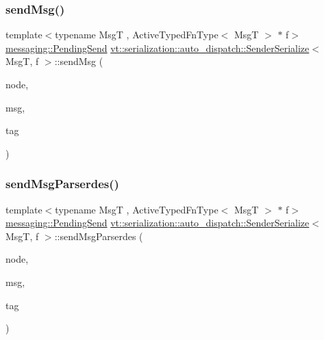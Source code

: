 \subsubsection{\texorpdfstring{send\+Msg()}{sendMsg()}}
{\footnotesize\ttfamily template$<$typename MsgT , Active\+Typed\+Fn\+Type$<$ Msg\+T $>$ $\ast$ f$>$ \\
\hyperlink{structvt_1_1messaging_1_1_pending_send}{messaging\+::\+Pending\+Send} \hyperlink{structvt_1_1serialization_1_1auto__dispatch_1_1_sender_serialize}{vt\+::serialization\+::auto\+\_\+dispatch\+::\+Sender\+Serialize}$<$ MsgT, f $>$\+::send\+Msg (\begin{DoxyParamCaption}\item[{\hyperlink{namespacevt_a866da9d0efc19c0a1ce79e9e492f47e2}{Node\+Type} const \&}]{node,  }\item[{MsgT $\ast$}]{msg,  }\item[{\hyperlink{namespacevt_a84ab281dae04a52a4b243d6bf62d0e52}{Tag\+Type} const \&}]{tag }\end{DoxyParamCaption})\hspace{0.3cm}{\ttfamily [static]}}

\mbox{\label{structvt_1_1serialization_1_1auto__dispatch_1_1_sender_serialize_aaca297ff56b6399da5cf29d74b623775}} 
\subsubsection{\texorpdfstring{send\+Msg\+Parserdes()}{sendMsgParserdes()}}
{\footnotesize\ttfamily template$<$typename MsgT , Active\+Typed\+Fn\+Type$<$ Msg\+T $>$ $\ast$ f$>$ \\
\hyperlink{structvt_1_1messaging_1_1_pending_send}{messaging\+::\+Pending\+Send} \hyperlink{structvt_1_1serialization_1_1auto__dispatch_1_1_sender_serialize}{vt\+::serialization\+::auto\+\_\+dispatch\+::\+Sender\+Serialize}$<$ MsgT, f $>$\+::send\+Msg\+Parserdes (\begin{DoxyParamCaption}\item[{\hyperlink{namespacevt_a866da9d0efc19c0a1ce79e9e492f47e2}{Node\+Type} const \&}]{node,  }\item[{MsgT $\ast$}]{msg,  }\item[{\hyperlink{namespacevt_a84ab281dae04a52a4b243d6bf62d0e52}{Tag\+Type} const \&}]{tag }\end{DoxyParamCaption})\hspace{0.3cm}{\ttfamily [static]}}



